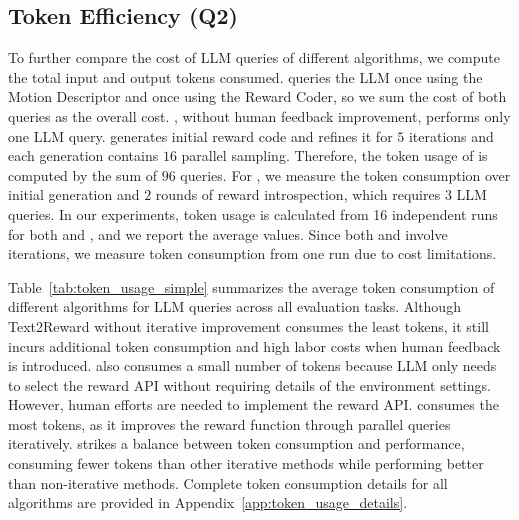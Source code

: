 \documentclass{article}
\theoremstyle{plain}
\theoremstyle{definition}
\theoremstyle{remark}
\begin{document}
\subsection{Token Efficiency (Q2)}

To further compare the cost of LLM queries of different algorithms, we compute the total input and output tokens consumed. \lr queries the LLM once using the Motion Descriptor and once using the Reward Coder, so we sum the cost of both queries as the overall cost. \tr, without human feedback improvement, performs only one LLM query. \eureka generates initial reward code and refines it for $5$ iterations and each generation contains $16$ parallel sampling. Therefore, the token usage of \eureka is computed by the sum of $96$ queries. For \ourmethod, we measure the token consumption over initial generation and $2$ rounds of reward introspection, which requires $3$ LLM queries. In our experiments, token usage is calculated from 16 independent runs for both \lr and \tr, and we report the average values. Since both \eureka and \ourmethod involve iterations, we measure token consumption from one run due to cost limitations.

Table~\ref{tab:token_usage_simple} summarizes the average token consumption of different algorithms for LLM queries across all evaluation tasks. Although Text2Reward without iterative improvement consumes the least tokens, it still incurs additional token consumption and high labor costs when human feedback is introduced. \lr also consumes a small number of tokens because LLM only needs to select the reward API without requiring details of the environment settings. However, human efforts are needed to implement the reward API. \eureka consumes the most tokens, as it improves the reward function through parallel queries iteratively. \ourmethod strikes a balance between token consumption and performance, consuming fewer tokens than other iterative methods while performing better than non-iterative methods. Complete token consumption details for all algorithms are provided in Appendix~\ref{app:token_usage_details}.


\begin{table}[!t]
\centering
\caption{Comparison of token usage among different methods averaged across all evaluation tasks.}
\label{tab:token_usage_simple}
\end{table}
\end{document}
